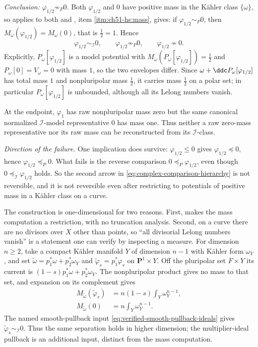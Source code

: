 \begin{example}
\emph{Conclusion: $\varphi_{1/2}\not\sim_P0$.}  Both
$\varphi_{1/2}$ and $0$
have positive mass in the K\"ahler class $\{\omega\}$, so
 applies to both and
, item \cref{itm:ch51-hs:mass}, gives:
if $\varphi_{1/2}\sim_P0$, then
$M_\omega(\varphi_{1/2})=M_\omega(0)$, that is $\tfrac12=1$.  Hence
\[
 \varphi_{1/2}\sim_{\mathcal I}0,
 \qquad
 \varphi_{1/2}\not\sim_P0,
 \qquad
 \varphi_{1/2}\not\sim0 .
\]
Explicitly, $P_\omega[\varphi_{1/2}]$ is a model potential with
$M_\omega(P_\omega[\varphi_{1/2}])=\tfrac12$ and
$P_\omega[0]=V_\omega=0$ with mass $1$, so the two envelopes differ.
Since $\omega+\ddc P_\omega[\varphi_{1/2}]$ has total mass $1$ and
nonpluripolar mass $\tfrac12$, it carries mass $\tfrac12$ on a polar
set; in particular $P_\omega[\varphi_{1/2}]$ is unbounded, although all its
Lelong numbers vanish.

At the endpoint, $\varphi_1$ has raw nonpluripolar mass zero but the
same canonical normalized $\mathcal I$-model representative $0$ has
mass one.  Thus neither a raw zero-mass representative nor its raw mass can
be reconstructed from its $\mathcal I$-class.

\emph{Direction of the failure.}  One implication does survive:
$\varphi_{1/2}\leq0$ gives $\varphi_{1/2}\preceq0$, hence
$\varphi_{1/2}\preceq_P0$.  What fails is the reverse comparison
$0\preceq_P\varphi_{1/2}$, even though
$0\preceq_{\mathcal I}\varphi_{1/2}$ holds.
So the second arrow in \eqref{eq:complex-comparison-hierarchy} is not
reversible, and it is not reversible even after restricting to potentials
of positive mass in a K\"ahler class on a curve.
\end{example}

\begin{remark}
\label{rem:ch51-cantor-dimension}
The construction is one-dimensional for two reasons.  First,
 makes the mass computation a
restriction, with no truncation analysis.  Second, on a curve there are
no divisors over $X$ other than points, so ``all divisorial Lelong
numbers vanish'' is a statement one can verify by inspecting a measure.
For dimension $n\geq2$, take a compact K\"ahler manifold $Y$ of
dimension $n-1$ with K\"ahler form $\omega_Y$, and set
$\widetilde\omega=p_1^*\omega+p_2^*\omega_Y$ and
$\widetilde\varphi_s=p_1^*\varphi_s$ on $\mathbf P^1\times Y$.
Off the pluripolar set $F\times Y$ its current is
$(1-s)p_1^*\omega+p_2^*\omega_Y$.  The nonpluripolar product gives
no mass to that set, and expansion on its complement gives
\[
 \begin{aligned}
 M_{\widetilde\omega}(\widetilde\varphi_s)
 &=n(1-s)\int_Y\omega_Y^{n-1},\\
 M_{\widetilde\omega}(0)&=n\int_Y\omega_Y^{n-1}.
 \end{aligned}
\]
The named smooth-pullback input
\eqref{eq:verified-smooth-pullback-ideals} gives
$\widetilde\varphi_s\sim_{\mathcal I}0$.  Thus the same separation
holds in higher dimension; the multiplier-ideal pullback is an additional
input, distinct from the mass computation.
\end{remark}


